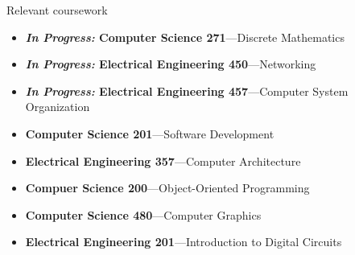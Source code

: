 \documentclass[10pt,oneside]{article}
\newenvironment{ressection}[1]{
	\vspace{4pt}
	{\fontfamily{phv}\selectfont\Large#1}
	\begin{itemize}
	\vspace{3pt}
}{
	\end{itemize}
}
\newcommand{\resitem}[1]{
	\vspace{-4pt}
	\item \begin{flushleft} #1 \end{flushleft}
}
\newcommand{\resshortbigitem}[2]{
	\vspace{-5pt}
	\item
	\textbf{#1}---#2
}
\begin{document}
\begin{ressection}{Relevant coursework}
	\resshortbigitem{\emph{In Progress:} Computer Science 271}{Discrete Mathematics}
	\resshortbigitem{\emph{In Progress:} Electrical Engineering 450}{Networking}
	\resshortbigitem{\emph{In Progress:} Electrical Engineering 457}{Computer System Organization}
	\resshortbigitem{Computer Science 201}{Software Development}
	\resshortbigitem{ Electrical Engineering 357}{Computer Architecture}
	\resshortbigitem{Compuer Science 200}{Object-Oriented Programming}
	\resshortbigitem{Computer Science 480}{Computer Graphics}
	\resshortbigitem{Electrical Engineering 201}{Introduction to Digital Circuits}
\end{ressection}






	
	

\end{document}
